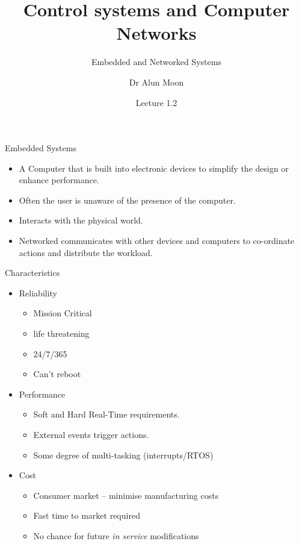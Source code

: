 \documentclass[xcolor=svgnames]{beamer}
\title{Control systems and Computer Networks}
\subtitle{Embedded and Networked Systems}
\author{Dr Alun Moon}
\date{Lecture 1.2}
\begin{document}
\frame{\maketitle}

\begin{frame}{Embedded Systems}
  \begin{itemize}[<+->]
  \item A \alert{Computer} that is built into \alert{electronic devices} to
        simplify the design or enhance performance.
  \item Often the user is unaware of the presence of the computer.
  \item Interacts with  the physical world.
  \item \alert{Networked} communicates with other devices and computers to
        co-ordinate actions and distribute the workload.
\end{itemize}
\end{frame}

\begin{frame}{Characteristics}
\begin{itemize}[<+->]
  \item Reliability
  \begin{itemize}
    \item Mission Critical
    \item life threatening
    \item 24/7/365
    \item Can't reboot
  \end{itemize}
    \item Performance
    \begin{itemize}
      \item \alert{Soft} and \alert{Hard} Real-Time requirements.
      \item External events trigger actions.
      \item Some degree of multi-tasking (interrupts/RTOS)
      \end{itemize}
    \item Cost
    \begin{itemize}
      \item Consumer market -- minimise manufacturing costs
      \item Fast time to market required
      \item No chance for future \emph{in service} modifications
    \end{itemize}
\end{itemize}
\end{frame}
\end{document}
